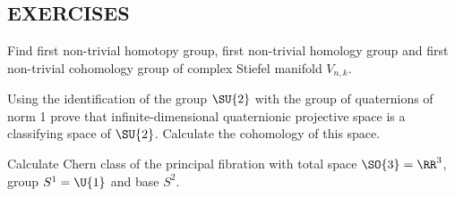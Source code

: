 \subsection*{EXERCISES}
\begin{xca}
Find first non-trivial homotopy group, first non-trivial homology group and first non-trivial cohomology group of complex Stiefel manifold $V_{n,k}$.
\end{xca}
\begin{xca}
Using the identification of the group $\SU{2}$ with the group of quaternions of norm 1 prove that infinite-dimensional quaternionic projective space is a classifying space of $\SU{2}$. Calculate the cohomology of this space.
\end{xca}
\begin{xca}
Calculate Chern class of the principal fibration with total space $\SO{3} = \RR^3$, group
$S^1 = \U{1}$ and base $S^2$.
\end{xca}

